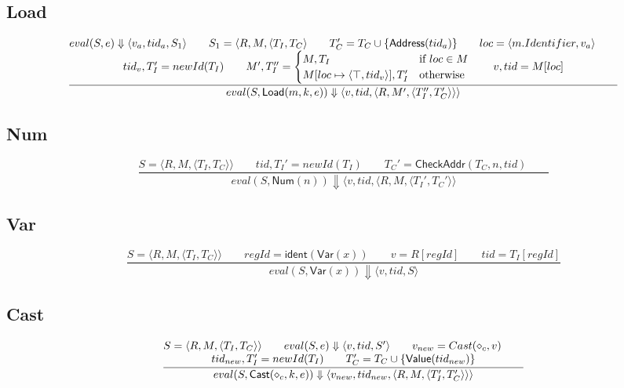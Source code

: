 \documentclass{article}
\newcommand{\eval}[3]{eval(#1,#2) \Downarrow #3}
\begin{document}
\subsection{Load}
\[
\frac{
    \begin{array}{@{}c@{}}
        \eval{S}{e}{\langle v_a,tid_a,S_1\rangle} \qquad
        S_1=\langle R,M,\langle T_I, T_C \rangle\qquad
        T_C'=T_C \cup \{\mathsf{Address}(tid_a)\}\qquad
        loc = \langle m.Identifier, v_a \rangle\qquad\\
        tid_v, T_I' = newId(T_I)\qquad
        M', T_I'' =
        \begin{cases}
            M, T_I & \text{if } loc \in M \\
            M[loc \mapsto \langle \top, tid_v \rangle], T_I' & \text{otherwise}
        \end{cases}\qquad
        v, tid = M[loc]
    \end{array}
} {
    \eval{S}{\mathsf{Load}(m,k,e)}
    {\langle v,tid,\langle R,M',\langle T_I'',T_C'\rangle\rangle\rangle}
}
\]

\subsection{Num}
\[
\frac{
    S=\langle R,M,\langle T_I, T_C \rangle \rangle \qquad
    tid, T_I' = newId(T_I)\qquad
    T_C' =\mathsf{CheckAddr}(T_C, n, tid)\qquad
}{
    \eval{S}{\mathsf{Num}(n)}
    {\langle v,tid,\langle R,M,\langle T_I', T_C' \rangle \rangle}
}
\]

\subsection{Var}
\[
\frac{
    S=\langle R,M,\langle T_I, T_C \rangle \rangle \qquad
    regId=\mathsf{ident}(\mathsf{Var}(x))\qquad
    v=R[regId]\qquad
    tid=T_I[regId]
}
{\eval{S}{\mathsf{Var}(x)}{\langle v,tid,S\rangle}}
\]

\subsection{Cast}
\[
\frac{
\begin{array}{@{}c@{}}
    S=\langle R,M,\langle T_I, T_C \rangle \rangle \qquad
    \eval{S}{e}{\langle v, tid, S' \rangle}\qquad
    v_{new} = Cast(\diamond_c, v)\qquad\\
    tid_{new},T_I' = newId(T_I)\qquad
    T_C'=T_C \cup \{\mathsf{Value}(tid_{new})\}
\end{array}
}
{
    \eval{S}{\mathsf{Cast}(\diamond_c,k,e)}
    {\langle v_{new}, tid_{new}, \langle R,M,\langle T_I', T_C' \rangle\rangle\rangle}
}
\]
\end{document}
